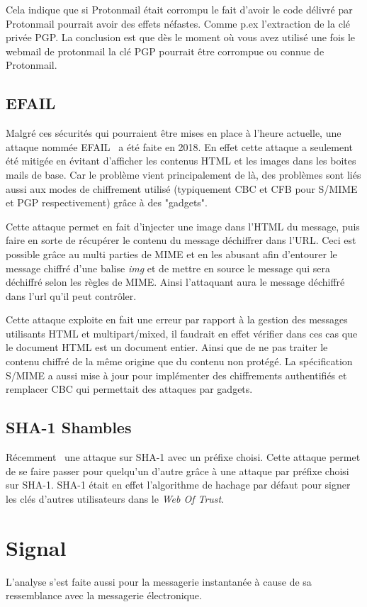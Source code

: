 Cela indique que si Protonmail était corrompu le fait d'avoir le code délivré par Protonmail pourrait avoir des effets néfastes. Comme p.ex l'extraction de la clé privée PGP. La conclusion est que dès le moment où vous avez utilisé une fois le webmail de protonmail la clé PGP pourrait être corrompue ou connue de Protonmail.
\subsection{EFAIL}
\label{attacks:EFAIL}
Malgré ces sécurités qui pourraient être mises en place à l’heure actuelle, une attaque nommée EFAIL~\cite{DBLP:conf/uss/PoddebniakD0ISF18} a été faite en 2018. En effet cette attaque a seulement été mitigée en évitant d’afficher les contenus HTML et les images dans les boites mails de base. Car le problème vient principalement de là, des problèmes sont liés aussi aux modes de chiffrement utilisé (typiquement CBC et CFB pour S/MIME et PGP respectivement) grâce à des "gadgets".

Cette attaque permet en fait d'injecter une image dans l'HTML du message, puis faire en sorte de récupérer le contenu du message déchiffrer dans l'URL. Ceci est possible grâce au multi parties de MIME et en les abusant afin d'entourer le message chiffré d'une balise \textit{img} et de mettre en source le message qui sera déchiffré selon les règles de MIME. Ainsi l'attaquant aura le message déchiffré dans l'url qu'il peut contrôler. 

Cette attaque exploite en fait une erreur par rapport à la gestion des messages utilisants HTML et multipart/mixed, il faudrait en effet vérifier dans ces cas que le document HTML est un document entier. Ainsi que de ne pas traiter le contenu chiffré de la même origine que du contenu non protégé. La spécification~\cite{RFC8551} S/MIME a aussi mise à jour pour implémenter des chiffrements authentifiés et remplacer CBC qui permettait des attaques par gadgets.
\subsection{SHA-1 Shambles}
Récemment~\cite{DBLP:journals/iacr/LeurentP20} une attaque sur SHA-1 avec un préfixe choisi. Cette attaque permet de se faire passer pour quelqu'un d'autre grâce à une attaque par préfixe choisi sur SHA-1. SHA-1 était en effet l'algorithme de hachage par défaut pour signer les clés d'autres utilisateurs dans le \textit{Web Of Trust}.
\section{Signal}
L'analyse s'est faite aussi pour la messagerie instantanée à cause de sa ressemblance avec la messagerie électronique. 

